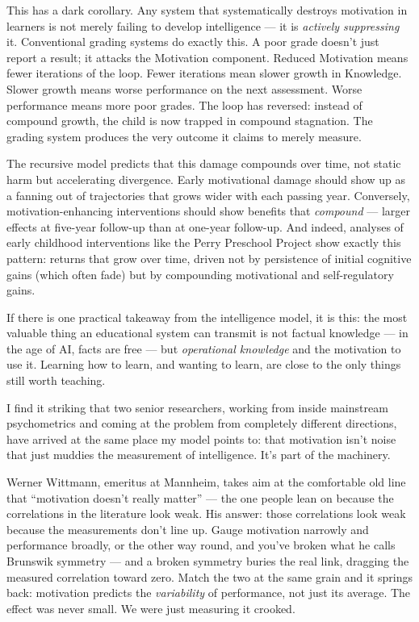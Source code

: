 \documentclass[11pt, twoside, openright]{book}
\begin{document}
This has a dark corollary. Any system that systematically destroys motivation in learners is not merely failing to develop intelligence --- it is \textit{actively suppressing} it. Conventional grading systems do exactly this. A poor grade doesn't just report a result; it attacks the Motivation component. Reduced Motivation means fewer iterations of the loop. Fewer iterations mean slower growth in Knowledge. Slower growth means worse performance on the next assessment. Worse performance means more poor grades. The loop has reversed: instead of compound growth, the child is now trapped in compound stagnation. The grading system produces the very outcome it claims to merely measure.

The recursive model predicts that this damage compounds over time, not static harm but accelerating divergence. Early motivational damage should show up as a fanning out of trajectories that grows wider with each passing year. Conversely, motivation-enhancing interventions should show benefits that \textit{compound} --- larger effects at five-year follow-up than at one-year follow-up. And indeed, analyses of early childhood interventions like the Perry Preschool Project show exactly this pattern: returns that grow over time, driven not by persistence of initial cognitive gains (which often fade) but by compounding motivational and self-regulatory gains.

If there is one practical takeaway from the intelligence model, it is this: the most valuable thing an educational system can transmit is not factual knowledge --- in the age of AI, facts are free --- but \textit{operational knowledge} and the motivation to use it. Learning how to learn, and wanting to learn, are close to the only things still worth teaching.

I find it striking that two senior researchers, working from inside mainstream psychometrics and coming at the problem from completely different directions, have arrived at the same place my model points to: that motivation isn't noise that just muddies the measurement of intelligence. It's part of the machinery.

Werner Wittmann, emeritus at Mannheim, takes aim at the comfortable old line that ``motivation doesn't really matter'' --- the one people lean on because the correlations in the literature look weak. His answer: those correlations look weak because the measurements don't line up. Gauge motivation narrowly and performance broadly, or the other way round, and you've broken what he calls Brunswik symmetry --- and a broken symmetry buries the real link, dragging the measured correlation toward zero. Match the two at the same grain and it springs back: motivation predicts the \textit{variability} of performance, not just its average. The effect was never small. We were just measuring it crooked.
\end{document}
